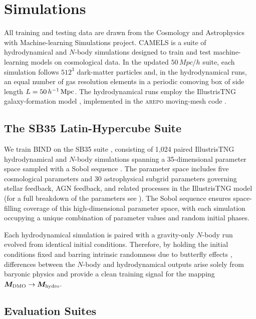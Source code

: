 \documentclass[linenumbers,trackchanges, twocolumn]{aastex701}
\begin{document}
\section{Simulations}
\label{sec:simulations}

All training and testing data are drawn from the Cosmology and Astrophysics with Machine-learning Simulations \citep[CAMELS;][]{VillaescusaNavarro-2021} project. CAMELS is a suite of hydrodynamical and $N$-body simulations designed to train and test machine-learning models on cosmological data. In the updated $50\,Mpc/h$ suite, each simulation follows \(512^3\) dark-matter particles and, in the hydrodynamical runs, an equal number of gas resolution elements in a periodic comoving box of side length $L = 50\,h^{-1}\,{\rm Mpc}$. The hydrodynamical runs employ the IllustrisTNG galaxy-formation model \citep{weinberger2017supermassive,pillepich2018simulating}, implemented in the \textsc{arepo} moving-mesh code \citep{springel2010arepo}.

\subsection{The SB35 Latin-Hypercube Suite}
\label{subsec:sb35}

We train \textsc{BIND} on the SB35 suite \citep{Genel-2026}, consisting of 1{,}024 paired IllustrisTNG hydrodynamical and $N$-body simulations spanning a 35-dimensional parameter space sampled with a Sobol sequence \citep{Sobol-1967}. The parameter space includes five cosmological parameters and 30 astrophysical subgrid parameters governing stellar feedback, AGN feedback, and related processes in the IllustrisTNG model (for a full breakdown of the parameters see \citealt{Genel-2026}). The Sobol sequence ensures space-filling coverage of this high-dimensional parameter space, with each simulation occupying a unique combination of parameter values and random initial phases.

Each hydrodynamical simulation is paired with a gravity-only $N$-body run evolved from identical initial conditions. Therefore, by holding the initial conditions fixed and barring intrinsic randomness due to butterfly effects \citep{Genel-2019}, differences between the $N$-body and hydrodynamical outputs arise solely from baryonic physics and provide a clean training signal for the mapping $\bm{M}_{\rm DMO} \rightarrow \bm{M}_{\rm hydro}$.

\subsection{Evaluation Suites}
\label{subsec:eval_suites}
\end{document}
